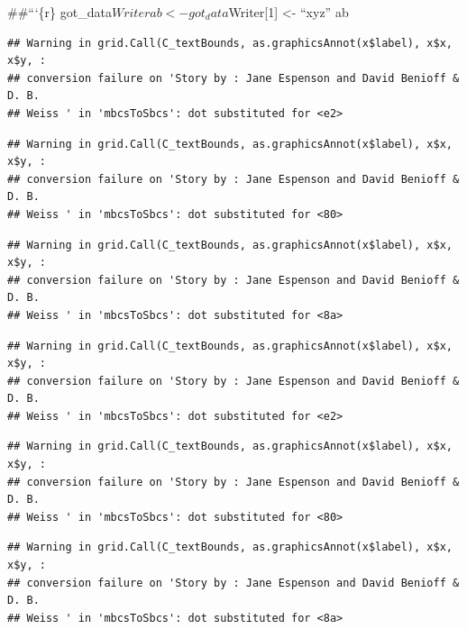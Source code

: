 \documentclass[]{article}
\newenvironment{Shaded}{\begin{snugshade}}{\end{snugshade}}
\newcommand{\KeywordTok}[1]{\textcolor[rgb]{0.13,0.29,0.53}{\textbf{#1}}}
\newcommand{\NormalTok}[1]{#1}
\newcommand{\OperatorTok}[1]{\textcolor[rgb]{0.81,0.36,0.00}{\textbf{#1}}}
\newcommand{\StringTok}[1]{\textcolor[rgb]{0.31,0.60,0.02}{#1}}
\begin{document}
\#\#```\{r\} got\_data\(Writer ab<-got_data\)Writer{[}1{]} \textless{}-
``xyz'' ab

\begin{Shaded}
\end{Shaded}

\begin{verbatim}
## Warning in grid.Call(C_textBounds, as.graphicsAnnot(x$label), x$x, x$y, :
## conversion failure on 'Story by : Jane Espenson and David Benioff & D. B.
## Weiss ' in 'mbcsToSbcs': dot substituted for <e2>
\end{verbatim}

\begin{verbatim}
## Warning in grid.Call(C_textBounds, as.graphicsAnnot(x$label), x$x, x$y, :
## conversion failure on 'Story by : Jane Espenson and David Benioff & D. B.
## Weiss ' in 'mbcsToSbcs': dot substituted for <80>
\end{verbatim}

\begin{verbatim}
## Warning in grid.Call(C_textBounds, as.graphicsAnnot(x$label), x$x, x$y, :
## conversion failure on 'Story by : Jane Espenson and David Benioff & D. B.
## Weiss ' in 'mbcsToSbcs': dot substituted for <8a>
\end{verbatim}

\begin{verbatim}
## Warning in grid.Call(C_textBounds, as.graphicsAnnot(x$label), x$x, x$y, :
## conversion failure on 'Story by : Jane Espenson and David Benioff & D. B.
## Weiss ' in 'mbcsToSbcs': dot substituted for <e2>
\end{verbatim}

\begin{verbatim}
## Warning in grid.Call(C_textBounds, as.graphicsAnnot(x$label), x$x, x$y, :
## conversion failure on 'Story by : Jane Espenson and David Benioff & D. B.
## Weiss ' in 'mbcsToSbcs': dot substituted for <80>
\end{verbatim}

\begin{verbatim}
## Warning in grid.Call(C_textBounds, as.graphicsAnnot(x$label), x$x, x$y, :
## conversion failure on 'Story by : Jane Espenson and David Benioff & D. B.
## Weiss ' in 'mbcsToSbcs': dot substituted for <8a>
\end{verbatim}
\end{document}

